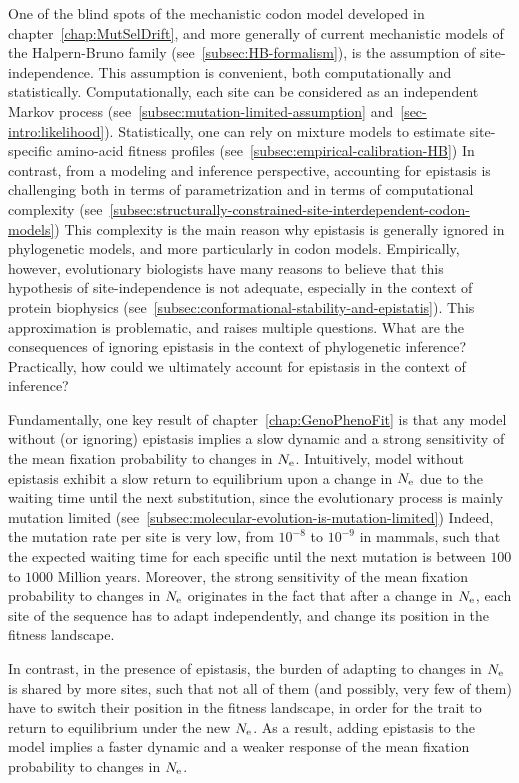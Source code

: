 One of the blind spots of the mechanistic codon model developed in chapter~\ref{chap:MutSelDrift}, and more generally of current mechanistic models of the Halpern-Bruno family (see~\ref{subsec:HB-formalism}), is the assumption of site-independence.
This assumption is convenient, both computationally and statistically.
Computationally, each site can be considered as an independent Markov process (see~\ref{subsec:mutation-limited-assumption} and~\ref{sec-intro:likelihood}).
Statistically, one can rely on mixture models to estimate site-specific amino-acid fitness profiles (see~\ref{subsec:empirical-calibration-HB})
In contrast, from a modeling and inference perspective, accounting for epistasis is challenging both in terms of parametrization and in terms of computational complexity (see~\ref{subsec:structurally-constrained-site-interdependent-codon-models})
This complexity is the main reason why epistasis is generally ignored in phylogenetic models, and more particularly in codon models.
Empirically, however, evolutionary biologists have many reasons to believe that this hypothesis of site-independence is not adequate, especially in the context of protein biophysics (see~\ref{subsec:conformational-stability-and-epistatis}).
This approximation is problematic, and raises multiple questions.
What are the consequences of ignoring epistasis in the context of phylogenetic inference?
Practically, how could we ultimately account for epistasis in the context of inference?

Fundamentally, one key result of chapter~\ref{chap:GenoPhenoFit} is that any model without (or ignoring) epistasis implies a slow dynamic and a strong sensitivity of the mean fixation probability to changes in $N_{\textrm{e}}$.
Intuitively, model without epistasis exhibit a slow return to equilibrium upon a change in $N_{\textrm{e}}$ due to the waiting time until the next substitution, since the evolutionary process is mainly mutation limited (see~\ref{subsec:molecular-evolution-is-mutation-limited})
Indeed, the mutation rate per site is very low, from $10^{-8}$ to $10^{-9}$ in mammals, such that the expected waiting time for each specific until the next mutation is between $100$ to $1000$ Million years.
Moreover, the strong sensitivity of the mean fixation probability to changes in $N_{\textrm{e}}$ originates in the fact that after a change in $N_{\textrm{e}}$, each site of the sequence has to adapt independently, and change its position in the fitness landscape.

In contrast, in the presence of epistasis, the burden of adapting to changes in $N_{\textrm{e}}$ is shared by more sites, such that not all of them (and possibly, very few of them) have to switch their position in the fitness landscape, in order for the trait to return to equilibrium under the new $N_{\textrm{e}}$.
As a result, adding epistasis to the model implies a faster dynamic and a weaker response of the mean fixation probability to changes in $N_{\textrm{e}}$.

